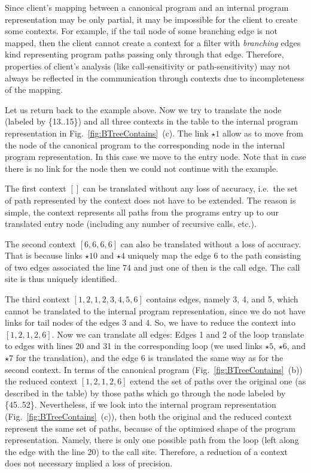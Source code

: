 \documentclass[envcountsame]{llncs}
\begin{document}
Since client's mapping between a canonical program and an internal program
representation may be only partial, it may be impossible for the client to
create some contexts. For example, if the tail node of some branching edge is
not mapped, then the client cannot create a context for a filter with
\textit{branching} edges kind representing program paths passing only through
that edge. Therefore, properties of client's analysis (like call-sensitivity or
path-sensitivity) may not always be  reflected in the communication through
contexts due to incompleteness of the mapping.

Let us return back to the example above. Now we try to translate the node
(labeled by \{13..15\}) and all three contexts in the table to the internal
program representation in Fig.~\ref{fig:BTreeContains}~(c). The link $ \star1 $
allow as to move from the node of the canonical program to the corresponding
node in the internal program representation. In this case we move to the entry
node. Note that in case there is no link for the node then we could not continue
with the example.

The first context $ [] $ can be translated without any loss of accuracy,
i.e.~the set of path represented by the context does not have to be extended.
The reason is simple, the context represents all paths from the programs entry
up to our translated entry node (including any number of recursive calls, etc.).

The second context $ [6,6,6,6] $ can also be translated without a loss of
accuracy. That is because links $ \star10 $ and $ \star4 $ uniquely map the edge
6 to the path consisting of two edges associated the line 74 and just one of
then is the call edge. The call site is thus uniquely identified.

The third context $ [1,2,1,2,3,4,5,6] $ contains edges, namely 3, 4, and 5,
which cannot be translated to the internal program representation, since we do
not have links for tail nodes of the edges 3 and 4. So, we have to reduce the
context into $ [1,2,1,2,6] $. Now we can translate all edges: Edges 1 and 2 of
the loop translate to edges with lines 20 and 31 in the corresponding loop (we
used links $ \star5 $, $ \star6 $, and $ \star7 $ for the translation), and the
edge 6 is translated the same way as for the second context. In terms of the
canonical program (Fig.~\ref{fig:BTreeContains}~(b)) the reduced context $
[1,2,1,2,6] $ extend the set of paths over the original one (as described in the
table) by those paths which go through the node labeled by \{45..52\}.
Nevertheless, if we look into the internal program representation
(Fig.~\ref{fig:BTreeContains}~(c)), then both the original and the reduced
context represent the same set of paths, because of the optimised shape of the
program representation. Namely, there is only one possible path from the loop
(left along the edge with the line 20) to the call site. Therefore, a reduction
of a context does not necessary implied a loss of precision.
\end{document}
